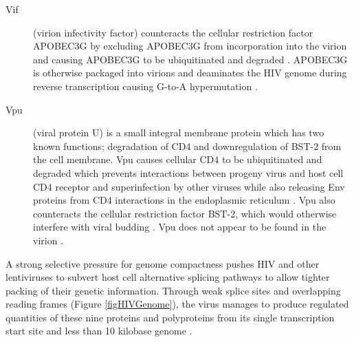 \documentclass[../sherrill-Mix_thesis.tex]{subfiles}
\begin{document}
\begin{description}
		\item[Vif]
			(virion infectivity factor) counteracts the cellular restriction factor APOBEC3G \citep{Sheehy2002} by excluding APOBEC3G from incorporation into the virion \citep{Mariani2003} and causing APOBEC3G to be ubiquitinated and degraded \citep{Sheehy2003,Marin2003,Yu2003}. APOBEC3G is otherwise packaged into virions \citep{Harris2003} and deaminates the HIV genome during reverse transcription causing G-to-A hypermutation \citep{Harris2003,Mangeat2003,Zhang2003,Lecossier2003}.
		\item[Vpu]
			(viral protein U) \citep{Cohen1988,Strebel1988} is a small integral membrane protein which has two known functions; degradation of CD4 and downregulation of BST-2 from the cell membrane. Vpu causes cellular CD4 to be ubiquitinated and degraded \citep{Willey1992,Bour1995} which prevents interactions between progeny virus and host cell CD4 receptor \citep{Marshall1992,Lama1999,Ross1999,Cortes2002} and superinfection by other viruses \citep{Benson1993}  while also releasing Env proteins from CD4 interactions in the endoplasmic reticulum \citep{Crise1990,Bour1991}. Vpu also counteracts the cellular restriction factor BST-2, which would otherwise interfere with viral budding \citep{Neil2008,VanDamme2008}. Vpu does not appear to be found in the virion \citep{Strebel1989}.
	\end{description}

	A strong selective pressure for genome compactness \citep{Gelinas1986,Herman1987,Shin2000} pushes HIV and other lentiviruses to subvert host cell alternative splicing pathways to allow tighter packing of their genetic information. Through weak splice sites \citep{Kammler2006} and overlapping reading frames (Figure \ref{figHIVGenome}), the virus manages to produce regulated quantities of these nine proteins and polyproteins from its single transcription start site and less than 10 kilobase genome \citep{Stoltzfus2009}.
\end{document}
